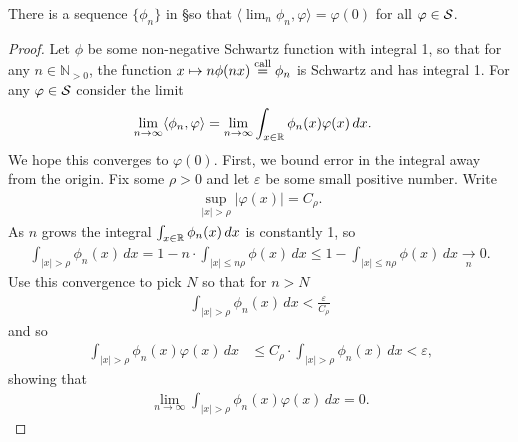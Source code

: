     \begin{thm}
      There is a sequence $\{\phi_n\}$ in \S so that $\langle\lim_n \phi_n,\varphi\rangle = \varphi(0)$ for all $\varphi\in\S$.
    \end{thm}
    \begin{proof}
      Let $\phi$ be some non-negative Schwartz function with integral 1, so that for any $n\in\mathbb{N}_{>0}$, the function $x\mapsto n\phi(nx) \call \phi_n$ is Schwartz and has integral 1.
      For any $\varphi\in\S$ consider the limit
      \begin{align*}
        \lim_{n\rightarrow\infty}\langle\phi_n,\varphi\rangle 
        &=\lim_{n\rightarrow\infty}\int_{x\in\R} \phi_n(x)\varphi(x)\,dx\text{.}
      \end{align*}
      We hope this converges to $\varphi(0)$.
      First, we bound error in the integral away from the origin.
      Fix some $\rho>0$ and let $\varepsilon$ be some small positive number.
      Write
      \begin{align*}
        \sup_{|x|>\rho} |\varphi(x)| = C_\rho \text{.}
      \end{align*}
      As $n$ grows the integral $\int_{x\in\R}\phi_n(x)\,dx$ is constantly 1, so
      \begin{align*}
        \int_{|x|>\rho} \phi_n(x)\,dx
        = 1-n\cdot\int_{|x|\le n\rho} \phi(x)\,dx
        \le 1-\int_{|x|\le n\rho} \phi(x)\,dx
        \underset n\longrightarrow 0 \text{.}
      \end{align*}
      Use this convergence to pick $N$ so that for $n>N$
      \begin{align*}
        \int_{|x|>\rho} \phi_n(x)\,dx
        < \frac\varepsilon{C_\rho}
      \end{align*}
      and so
      \begin{align*}
        \int_{|x|>\rho} \phi_n(x)\varphi(x)\,dx
        &\le C_\rho \cdot \int_{|x|>\rho} \phi_n(x)\,dx
        < \varepsilon \text{,}
      \end{align*}
      showing that
      \begin{align*}
        \lim_{n\rightarrow\infty} \int_{|x|>\rho} \phi_n(x)\varphi(x)\,dx
        = 0 \text{.}
      \end{align*}


\end{proof}
